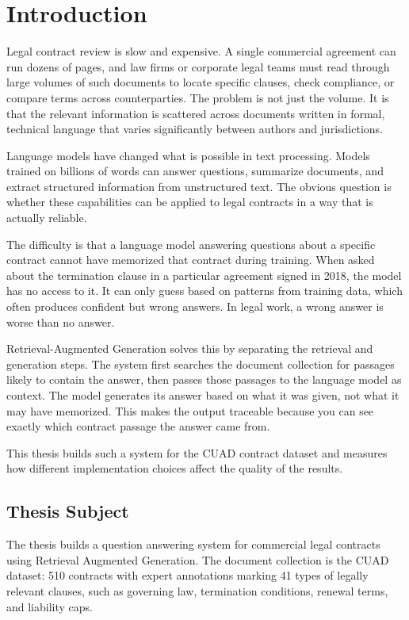 \chapter{Introduction}
\label{chap1}

Legal contract review is slow and expensive. A single commercial agreement can run dozens of pages, and law firms or corporate legal teams must read through large volumes of such documents to locate specific clauses, check compliance, or compare terms across counterparties. The problem is not just the volume. It is that the relevant information is scattered across documents written in formal, technical language that varies significantly between authors and jurisdictions.

Language models have changed what is possible in text processing. Models trained on billions of words can answer questions, summarize documents, and extract structured information from unstructured text. The obvious question is whether these capabilities can be applied to legal contracts in a way that is actually reliable.

The difficulty is that a language model answering questions about a specific contract cannot have memorized that contract during training. When asked about the termination clause in a particular agreement signed in 2018, the model has no access to it. It can only guess based on patterns from training data, which often produces confident but wrong answers. In legal work, a wrong answer is worse than no answer.

Retrieval-Augmented Generation solves this by separating the retrieval and generation steps. The system first searches the document collection for passages likely to contain the answer, then passes those passages to the language model as context. The model generates its answer based on what it was given, not what it may have memorized. This makes the output traceable because you can see exactly which contract passage the answer came from.

This thesis builds such a system for the CUAD contract dataset and measures how different implementation choices affect the quality of the results.



\section{Thesis Subject}

The thesis builds a question answering system for commercial legal contracts using Retrieval Augmented Generation. The document collection is the CUAD dataset: 510 contracts with expert annotations marking 41 types of legally relevant clauses, such as governing law, termination conditions, renewal terms, and liability caps.

